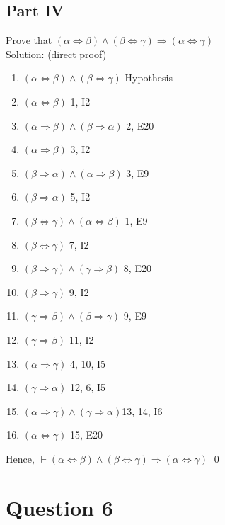 \documentclass{article}
\begin{document}
		\subsection{Part IV}
			Prove that $(\alpha \Leftrightarrow \beta) \land (\beta \Leftrightarrow \gamma) \Rightarrow (\alpha \Leftrightarrow \gamma)$ \\
			Solution: (direct proof) \\
			\begin{enumerate}
				\item $(\alpha \Leftrightarrow \beta) \land (\beta \Leftrightarrow \gamma)$           											 	\hfill Hypothesis 
				\item $(\alpha \Leftrightarrow \beta)$								\hfill 1, I2 
				\item $(\alpha \Rightarrow \beta) \land (\beta \Rightarrow\alpha)$  \hfill 2, E20 
				\item $(\alpha \Rightarrow \beta)$									\hfill 3, I2 
				\item $(\beta \Rightarrow \alpha) \land (\alpha \Rightarrow \beta)$ \hfill 3, E9 
				\item $(\beta \Rightarrow \alpha)$									\hfill 5, I2 
				\item $(\beta \Leftrightarrow \gamma) \land (\alpha \Leftrightarrow \beta)$																\hfill 1, E9 
				\item $(\beta \Leftrightarrow \gamma)$								\hfill 7, I2 
				\item $(\beta \Rightarrow\gamma) \land (\gamma \Rightarrow \beta)$	\hfill 8, E20 
				\item $(\beta \Rightarrow\gamma)$									\hfill 9, I2 
				\item $(\gamma \Rightarrow \beta) \land (\beta \Rightarrow\gamma)$	\hfill 9, E9 
				\item $(\gamma \Rightarrow \beta)$									\hfill 11, I2 
				\item $(\alpha \Rightarrow \gamma)$									\hfill 4, 10, I5 
				\item $(\gamma \Rightarrow \alpha)$									\hfill 12, 6, I5 
				\item $(\alpha \Rightarrow \gamma) \land (\gamma \Rightarrow \alpha)$\hfill 13, 14, I6 
				\item $(\alpha \Leftrightarrow \gamma)$								\hfill 15, E20 
			\end{enumerate}
			Hence, $\vdash$$(\alpha \Leftrightarrow \beta) \land (\beta \Leftrightarrow \gamma) \Rightarrow (\alpha \Leftrightarrow \gamma)$ \hfill \qed 
	\section{Question 6}
\end{document}
